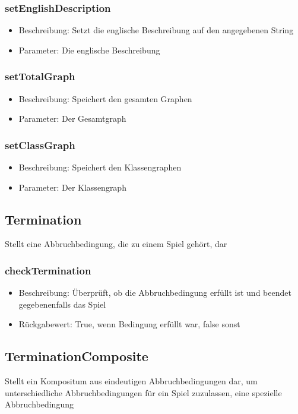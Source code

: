 \documentclass[a4paper]{scrreprt}
\begin{document}
    \subsubsection{setEnglishDescription}
    \begin{itemize}
        \item Beschreibung: Setzt die englische Beschreibung auf den angegebenen String
        \item Parameter: Die englische Beschreibung
    \end{itemize}
    \subsubsection{setTotalGraph}
    \begin{itemize}
        \item Beschreibung: Speichert den gesamten Graphen
        \item Parameter: Der Gesamtgraph
    \end{itemize}
    \subsubsection{setClassGraph}
    \begin{itemize}
        \item Beschreibung: Speichert den Klassengraphen
        \item Parameter: Der Klassengraph
    \end{itemize}

    \subsection{Termination}
    Stellt eine Abbruchbedingung, die zu einem Spiel gehört, dar
    \subsubsection{checkTermination}
    \begin{itemize}
        \item Beschreibung: Überprüft, ob die Abbruchbedingung erfüllt ist und beendet gegebenenfalls das Spiel
        \item Rückgabewert: True, wenn Bedingung erfüllt war, false sonst
    \end{itemize}

    \subsection{TerminationComposite}
    Stellt ein Kompositum aus eindeutigen Abbruchbedingungen dar, um unterschiedliche Abbruchbedingungen für ein Spiel zuzulassen, eine spezielle Abbruchbedingung
\end{document}
